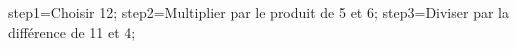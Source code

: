 \documentclass[exercice]{thedocument}%
\begin{document}
%
    \>step1=Choisir 12;%
    \>step2=Multiplier par le produit de 5 et 6;%
    \>step3=Diviser par la différence de 11 et 4;%
\end{document}
